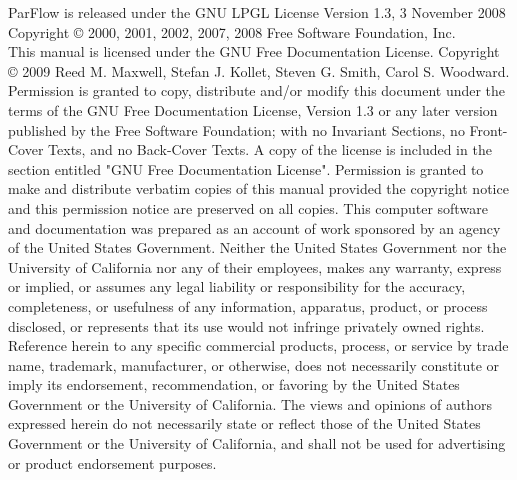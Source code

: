 
\begin{CopyrightPage}
\noindent ParFlow is released under the GNU LPGL License \newline
\noindent Version 1.3, 3 November 2008 \newline
\noindent Copyright \copyright{} 2000, 2001, 2002, 2007, 2008  Free Software Foundation, Inc.\newline
{}\\
This manual is licensed under the GNU Free Documentation License.\newline\vspace{1em}
Copyright \copyright{} 2009  Reed M. Maxwell, Stefan J. Kollet, Steven G. Smith, Carol S. Woodward. 
Permission is granted to copy, distribute and/or modify this document
under the terms of the GNU Free Documentation License, Version 1.3
or any later version published by the Free Software Foundation; with no Invariant Sections, no Front-Cover Texts, and no Back-Cover Texts. A copy of the license is included in the section entitled "GNU Free Documentation License".
Permission is granted to make and distribute verbatim copies of this
manual provided the copyright notice and this permission notice are
preserved on all copies.\newline\vspace{0.1em}
This computer software and documentation was prepared as an account of
work sponsored by an agency of the United  States Government.  Neither
the United States Government nor the  University of California nor any
of their employees, makes any warranty, express or implied, or assumes
any legal liability  or responsibility for the accuracy, completeness,
or   usefulness of any   information,  apparatus, product, or  process
disclosed,   or represents that  its  use would not infringe privately
owned rights.  Reference  herein to any specific  commercial products,
process,   or service by   trade  name,  trademark,  manufacturer,  or
otherwise, does not  necessarily constitute or imply its  endorsement,
recommendation, or  favoring  by the  United  States Government or the
University of California.  The views and opinions of authors expressed
herein do not necessarily state or reflect those  of the United States
Government or the University of California, and shall  not be used for
advertising or product endorsement purposes.
\end{CopyrightPage}


